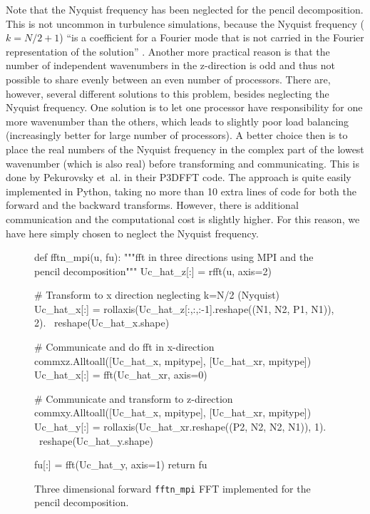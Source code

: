 \documentclass[final,3p,times,twocolumn]{elsarticle}
\newcommand{\inpyth}{\lstinline[style=inlinestyle]}
\begin{document}
Note that the Nyquist frequency has been neglected for the pencil 
decomposition. This is not uncommon in turbulence simulations, because the 
Nyquist frequency ($k=N/2+1$) ``is a coefficient for a Fourier mode
that is not carried in the Fourier representation of the solution'' 
\cite{Lee2013}.  Another more practical reason is that the number of 
independent wavenumbers in the z-direction is odd and thus not possible to 
share evenly between an even number of processors. There are, however, several 
different solutions to this problem, besides neglecting the Nyquist frequency. 
One solution is to let one processor have responsibility for one
more wavenumber than the others, which leads to slightly poor load balancing 
(increasingly better for large number of processors). A better choice then is 
to place the real numbers of the Nyquist frequency in the complex part of the 
lowest wavenumber (which is also real) before transforming and communicating. 
This is done by Pekurovsky et~al. \cite{pekurovsky2012} in their P3DFFT code. 
The approach is quite easily implemented in Python, taking no more than 10 
extra lines of code for both the forward and the backward
transforms. However, there is additional communication and the computational 
cost is slightly higher. For this reason, we have here simply chosen to neglect 
the Nyquist frequency.

\begin{figure*}
\begin{python}
def fftn_mpi(u, fu):
    """fft in three directions using MPI and the pencil decomposition"""
    Uc_hat_z[:] = rfft(u, axis=2)

    # Transform to x direction neglecting k=N/2 (Nyquist)
    Uc_hat_x[:] = rollaxis(Uc_hat_z[:,:,:-1].reshape((N1, N2, P1, N1)), 2). \
                                             reshape(Uc_hat_x.shape)

    # Communicate and do fft in x-direction
    commxz.Alltoall([Uc_hat_x, mpitype], [Uc_hat_xr, mpitype])
    Uc_hat_x[:] = fft(Uc_hat_xr, axis=0)

    # Communicate and transform to z-direction
    commxy.Alltoall([Uc_hat_x, mpitype], [Uc_hat_xr, mpitype])
    Uc_hat_y[:] = rollaxis(Uc_hat_xr.reshape((P2, N2, N2, N1)), 1). \
                                     reshape(Uc_hat_y.shape)

    fu[:] = fft(Uc_hat_y, axis=1)
    return fu
\end{python}
\caption{Three dimensional forward \inpyth{fftn_mpi}  FFT implemented for the 
pencil decomposition.}
\label{fig:fftn_pencil}
\end{figure*}
\end{document}
